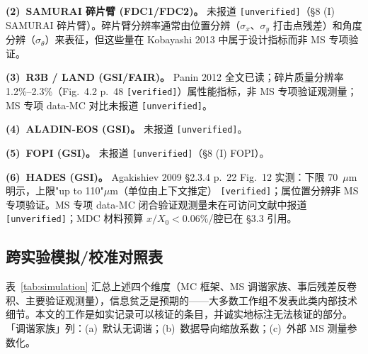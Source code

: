 \documentclass[a4paper, 11pt]{article}
\begin{document}
\textbf{(2)~SAMURAI 碎片臂 (FDC1/FDC2)。}
未报道 \texttt{[unverified]}（§8 (I) SAMURAI 碎片臂）。碎片臂分辨率通常由位置分辨（$\sigma_x$、$\sigma_y$ 打击点残差）和角度分辨（$\sigma_\theta$）来表征，但这些量在 Kobayashi 2013 中属于设计指标而非 MS 专项验证。

\textbf{(3)~R3B / LAND (GSI/FAIR)。}
Panin 2012 全文已读；碎片质量分辨率 1.2\%--2.3\%（Fig.~4.2 p.~48 \texttt{[verified]}）属性能指标，非 MS 专项验证观测量；MS 专项 data-MC 对比未报道 \texttt{[unverified]}。

\textbf{(4)~ALADIN-EOS (GSI)。}
未报道 \texttt{[unverified]}。

\textbf{(5)~FOPI (GSI)。}
未报道 \texttt{[unverified]}（§8 (I) FOPI）。

\textbf{(6)~HADES (GSI)。}
Agakishiev 2009 §2.3.4 p.~22 Fig.~12 实测：下限 70~$\mu$m 明示，上限"up to 110"$\mu$m（单位由上下文推定） \texttt{[verified]}；属位置分辨非 MS 专项验证。MS 专项 data-MC 闭合验证观测量未在可访问文献中报道 \texttt{[unverified]}；MDC 材料预算 $x/X_0 < 0.06\%$/腔已在 §3.3 引用。

\subsection{跨实验模拟/校准对照表}
\label{sec:simulationtable}

表~\ref{tab:simulation} 汇总上述四个维度（MC 框架、MS 调谐家族、事后残差反卷积、主要验证观测量），信息贫乏是预期的——大多数工作组不发表此类内部技术细节。本文的工作是如实记录可以核证的条目，并诚实地标注无法核证的部分。「调谐家族」列：(a)~默认无调谐；(b)~数据导向缩放系数；(c)~外部 MS 测量参数化。
\end{document}
